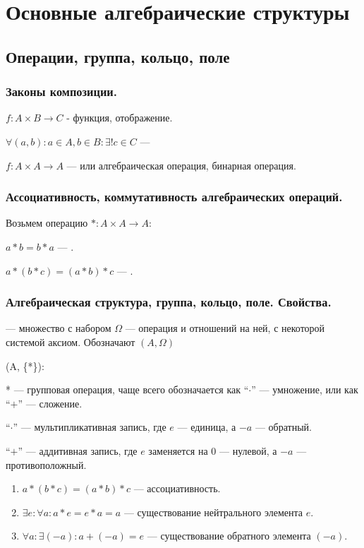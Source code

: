 \section{Основные алгебраические структуры}
\subsection{Операции, группа, кольцо, поле}
\subsubsection{Законы композиции.}

$f: A \times B \rightarrow C$ - функция, отображение.

$\forall (a,b): a \in A, b \in B: \exists! c \in C$ --- 

$f: A \times A \rightarrow A$ ---  или алгебраическая операция, бинарная операция.

\subsubsection{Ассоциативность, коммутативность алгебраических операций.}

Возьмем операцию $*: A \times A \rightarrow A$:

$a * b = b * a$ --- .

$a * (b *c) = (a * b) *c$ --- .


\subsubsection{Алгебраическая структура, группа, кольцо, поле. Свойства.}

 --- множество с набором $\Omega$ --- операция и отношений на ней, с некоторой системой аксиом. Обозначают $(A, \Omega)$

 (A, \{*\}):

* --- групповая операция, чаще всего обозначается как ``$\cdot$'' --- умножение, или как ``$+$'' --- сложение.

``$\cdot$'' --- мультипликативная запись, где $e$ --- единица, а $-a$ --- обратный.

``$+$'' --- аддитивная запись, где $e$ заменяется на $0$ --- нулевой, а $-a$ --- противоположный.

\begin{enumerate}
    \item $a * (b * c) = (a * b) * c$ --- ассоциативность.
    \item $\exists e:\forall a: a * e = e * a = a$ --- существование нейтрального элемента $e$.
    \item $\forall a: \exists (-a): a+ (-a) = e$ --- существование обратного элемента $(-a)$.
\end{enumerate}

